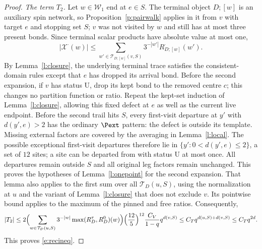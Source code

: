\begin{proof}
\emph{The term $T_2$.} Let $w\in\mathcal W_1$ end at $e\in S$.
The terminal object $D;[w]$ is an auxiliary spin network, so
Proposition~\ref{p:pairwalk} applies in it from $v$ with target $e$
and stopping set $S$; $v$ was not visited by $w$ and still has at
most three present bonds. Since terminal scalar products have absolute
value at most one,
\[
|\mathcal X^\cdot(w)|\le
\sum_{w'\in\mathcal T_{D;[w]}(v,S)}
3^{-|w'|}R^\cdot_{D;[w]}(w').
\]
By Lemma~\ref{l:closure}, the underlying terminal trace satisfies the
consistent-domain rules except that $e$ has dropped its arrival bond.
Before the second expansion, if $v$ has status $\mathrm U$, drop
its kept bond to the removed centre $c$; this changes no partition
function or ratio. Repeat the kept-set induction of
Lemma~\ref{l:closure}, allowing this fixed defect at $e$ as well as
the current live endpoint. Before the second trail hits $S$, every
first-visit departure at $y'$ with $d(y',e)>2$ has the ordinary
$\Pext$ pattern: the defect is outside its template. Missing
external factors are covered by the averaging in
Lemma~\ref{l:local}. The possible exceptional first-visit departures
therefore lie in $\{y':0<d(y',e)\le2\}$, a set of $12$ sites;
a site can be departed from with status $\mathrm U$ at most once.
All departures remain outside $S$ and all original leg factors remain
unchanged. This proves the hypotheses of Lemma~\ref{l:onepoint} for
the second expansion. That lemma also applies to the first sum over
all $\mathcal T_D(u,S)$, using the normalization at $u$ and the
variant of Lemma~\ref{l:closure} that does not exclude $v$. Its
pointwise bound applies to the maximum of the pinned and free ratios.
Consequently,
\begin{equation*}
|T_2| \le 2 \Bigl( \sum_{w \in \mathcal T_D(u, S)} 3^{-|w|} \max(R^\tau_D, R^0_D)(w) \Bigr) \Bigl( \frac{12}{5} \Bigr)^{12} \frac{C_V}{1 - q} q^{d(v, S)} \le C_T q^{d(u, S) + d(v, S)} \le C_T q^{2d} .
\end{equation*}
This proves \eqref{e:recineq}.


\end{proof}
